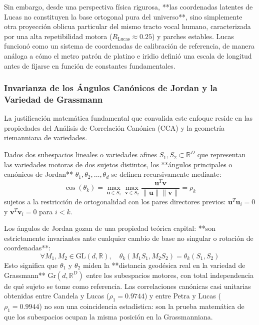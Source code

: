 \documentclass[11pt,a4paper]{article}
\begin{document}
Sin embargo, desde una perspectiva física rigurosa, **las coordenadas latentes de Lucas no constituyen la base ortogonal pura del universo**, sino simplemente otra proyección oblicua particular del mismo tracto vocal humano, caracterizada por una alta repetibilidad motora ($R_{\text{Lucas}} \approx 0.25$) y parches estables. Lucas funcionó como un sistema de coordenadas de calibración de referencia, de manera análoga a cómo el metro patrón de platino e iridio definió una escala de longitud antes de fijarse en función de constantes fundamentales.

\subsubsection{Invarianza de los Ángulos Canónicos de Jordan y la Variedad de Grassmann}
\label{subsubsec:invarianza_jordan_grassmann}

La justificación matemática fundamental que convalida este enfoque reside en las propiedades del Análisis de Correlación Canónica (CCA) y la geometría riemanniana de variedades. 

Dados dos subespacios lineales o variedades afines $S_1, S_2 \subset \mathbb{R}^D$ que representan las variedades motoras de dos sujetos distintos, los **ángulos principales o canónicos de Jordan** $\theta_1, \theta_2, \dots, \theta_d$ se definen recursivamente mediante:
\begin{equation}
\cos(\theta_k) = \max_{\mathbf{u} \in S_1} \max_{\mathbf{v} \in S_2} \frac{\mathbf{u}^T \mathbf{v}}{\|\mathbf{u}\| \|\mathbf{v}\|} = \rho_k
\end{equation}
sujetos a la restricción de ortogonalidad con los pares directores previos: $\mathbf{u}^T \mathbf{u}_i = 0$ y $\mathbf{v}^T \mathbf{v}_i = 0$ para $i < k$.

Los ángulos de Jordan gozan de una propiedad teórica capital: **son estrictamente invariantes ante cualquier cambio de base no singular o rotación de coordenadas**:
\begin{equation}
\forall M_1, M_2 \in \text{GL}(d, \mathbb{R}), \quad \theta_k(M_1 S_1, M_2 S_2) = \theta_k(S_1, S_2)
\end{equation}
Esto significa que $\theta_1$ y $\theta_2$ miden la **distancia geodésica real en la variedad de Grassmann** $\text{Gr}(d, \mathbb{R}^D)$ entre los subespacios motores, con total independencia de qué sujeto se tome como referencia. Las correlaciones canónicas casi unitarias obtenidas entre Candela y Lucas ($\rho_1 = 0.9744$) y entre Petra y Lucas ($\rho_1 = 0.9944$) no son una coincidencia estadística: son la prueba matemática de que los subespacios ocupan la misma posición en la Grassmanniana.
\end{document}
